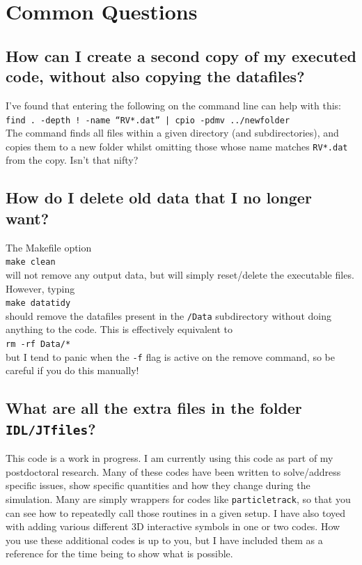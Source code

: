 \documentclass[a4paper,11pt,usenames,dvipsnames]{article}
\begin{document}
\section{Common Questions}

\subsection*{How can I create a second copy of my executed code, without also copying the datafiles?}
I've found that entering the following on the command line can help with this:\\
\texttt{find . -depth ! -name ``RV*.dat'' | cpio -pdmv ../newfolder}\\
The command finds all files within a given directory (and subdirectories), and copies them to a new folder whilst omitting those whose name matches \texttt{RV*.dat} from the copy. Isn't that nifty?

\subsection*{How do I delete old data that I no longer want?}
The Makefile option\\
\texttt{make clean}\\
will not remove any output data, but will simply reset/delete the executable files. However, typing\\
\texttt{make datatidy}\\
should remove the datafiles present in the \texttt{/Data} subdirectory without doing anything to the code. This is effectively equivalent to\\
\texttt{rm -rf Data/*}\\
but I tend to panic when the \texttt{-f} flag is active on the remove command, so be careful if you do this manually!

\subsection*{What are all the extra files in the folder \texttt{IDL/JTfiles}?}
This code is a work in progress. I am currently using this code as part of my postdoctoral research. Many of these codes have been written to solve/address specific issues, show specific quantities and how they change during the simulation. Many are simply wrappers for codes like \texttt{particletrack}, so that you can see how to repeatedly call those routines in a given setup. I have also toyed with adding various different 3D interactive symbols in one or two codes. How you use these additional codes is up to you, but I have included them as a reference for the time being to show what is possible.

\pagebreak
\newpage
 
  
\end{document}
